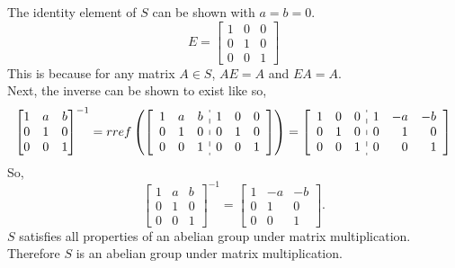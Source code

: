 \documentclass[titlepage]{article}
\newenvironment{problem}[2][Problem]{\begin{trivlist}
\item[\hskip \labelsep {\bfseries #1}\hskip \labelsep {\bfseries #2.}]}{\end{trivlist}}
\begin{document}
\begin{problem}{11}
The identity element of $S$ can be shown with $a=b=0$.
$$E = \begin{bmatrix} 1&0&0 \\ 0&1&0 \\ 0&0&1 \end{bmatrix} $$
This is because for any matrix $A \in S$, $AE = A$ and $EA = A$. \\
Next, the inverse can be shown to exist like so,
$$\begin{bmatrix}1&a&b\\0&1&0\\0&0&1\end{bmatrix}^{-1} = rref\left(\left[\begin{array}{ccc:ccc}1&a&b &1&0&0\\0&1&0 &0&1&0\\0&0&1 &0&0&1 \end{array}\right]\right) = \left[\begin{array}{ccc:ccc}1&0&0&1&-a&-b\\0&1&0&0&\phantom{-}1&\phantom{-}0\\0&0&1&0&\phantom{-}0&\phantom{-}1\end{array}\right]$$
So,
$$ \begin{bmatrix}1&a&b\\0&1&0\\0&0&1\end{bmatrix}^{-1} = \begin{bmatrix} 1&-a&-b \\ 0&1&0 \\ 0&0&1\end{bmatrix}.$$
$S$ satisfies all properties of an abelian group under matrix multiplication. Therefore $S$ is an abelian group under matrix multiplication. 
\end{problem}
\end{document}
